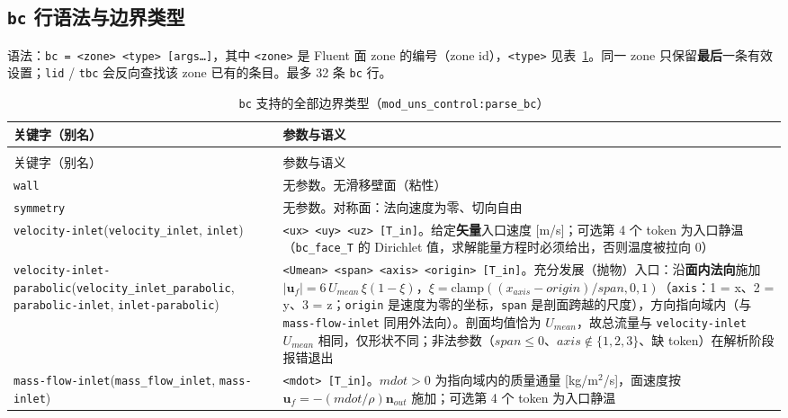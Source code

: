 \subsection{\texttt{bc} 行语法与边界类型}\label{app:bc}

语法：\texttt{bc = <zone> <type> [args\dots]}，其中 \texttt{<zone>} 是 Fluent
面 zone 的编号（zone id），\texttt{<type>} 见表~\ref{tab:bc-types}。同一 zone
只保留\textbf{最后}一条有效设置；\texttt{lid} / \texttt{tbc} 会反向查找该
zone 已有的条目。最多 32 条 \texttt{bc} 行。

{\small
\begin{longtable}{@{}>{\raggedright\arraybackslash}p{}>{\raggedright\arraybackslash}p{}@{}}
\caption{\texttt{bc} 支持的全部边界类型（\texttt{mod\_uns\_control:parse\_bc}）}\label{tab:bc-types}\\
\toprule
关键字（别名） & 参数与语义 \\
\midrule
\endfirsthead
\multicolumn{2}{@{}l}{\small\itshape 表~\ref{tab:bc-types}（续）}\\
\toprule
关键字（别名） & 参数与语义 \\
\midrule
\endhead
\bottomrule
\endlastfoot
\texttt{wall} & 无参数。无滑移壁面（粘性） \\
\texttt{symmetry} & 无参数。对称面：法向速度为零、切向自由 \\
\texttt{velocity-inlet}\newline (\texttt{velocity\_inlet}, \texttt{inlet}) & \texttt{<ux> <uy> <uz> [T\_in]}。给定\textbf{矢量}入口速度 [m/s]；可选第 4 个 token 为入口静温（\texttt{bc\_face\_T} 的 Dirichlet 值，求解能量方程时必须给出，否则温度被拉向 0） \\
\texttt{velocity-inlet-parabolic}\newline (\texttt{velocity\_inlet\_parabolic}, \texttt{parabolic-inlet}, \texttt{inlet-parabolic}) & \texttt{<Umean> <span> <axis> <origin> [T\_in]}。充分发展（抛物）入口：沿\textbf{面内法向}施加 $|\mathbf{u}_f| = 6\,U_{mean}\,\xi(1-\xi)$，$\xi = \mathrm{clamp}((x_{axis}-origin)/span,0,1)$（\texttt{axis}：1 = x、2 = y、3 = z；\texttt{origin} 是速度为零的坐标，\texttt{span} 是剖面跨越的尺度），方向指向域内（与 \texttt{mass-flow-inlet} 同用外法向）。剖面均值恰为 $U_{mean}$，故总流量与 \texttt{velocity-inlet} $U_{mean}$ 相同，仅形状不同；非法参数（$span\le0$、$axis\notin\{1,2,3\}$、缺 token）在解析阶段报错退出 \\
\texttt{mass-flow-inlet}\newline (\texttt{mass\_flow\_inlet}, \texttt{mass-inlet}) & \texttt{<mdot> [T\_in]}。$mdot>0$ 为指向域内的质量通量 [kg/m$^2$/s]，面速度按 $\mathbf{u}_f = -(mdot/\rho)\mathbf{n}_{out}$ 施加；可选第 4 个 token 为入口静温 \\

\end{longtable}}
